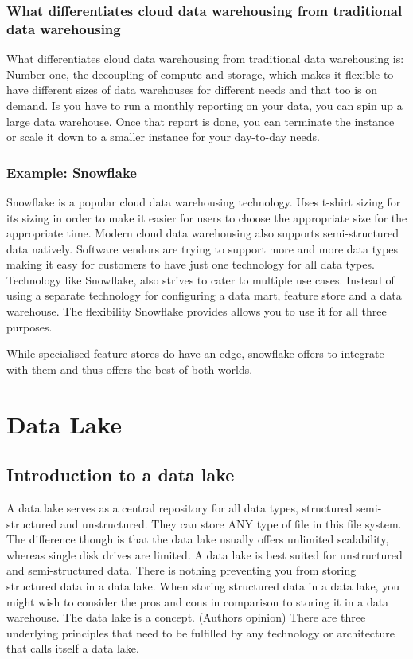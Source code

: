 \documentclass[a4paper, 11pt]{book}
\begin{document}
    \subsubsection{What differentiates cloud data warehousing from traditional data warehousing}
    What differentiates cloud data warehousing from traditional data warehousing is:
    Number one, the decoupling of compute and storage, which makes it flexible to have different sizes of data warehouses for different needs and that too is on demand.
    Is you have to run a monthly reporting on your data, you can spin up a large data warehouse.
    Once that report is done, you can terminate the instance or scale it down to a smaller instance for your day-to-day needs.

    \subsubsection{Example: Snowflake}
    Snowflake is a popular cloud data warehousing technology.
    Uses t-shirt sizing for its sizing in order to make it easier for users to choose the appropriate size for the appropriate time.
    Modern cloud data warehousing also supports semi-structured data natively.
    Software vendors are trying to support more and more data types making it easy for customers to have just one technology for all data types.
    Technology like Snowflake, also strives to cater to multiple use cases.
    Instead of using a separate technology for configuring a data mart, feature store and a data warehouse.
    The flexibility Snowflake provides allows you to use it for all three purposes.

    While specialised feature stores do have an edge, snowflake offers to integrate with them and thus offers the best of both worlds.

    \section{Data Lake}


    \subsection{Introduction to a data lake}
    A data lake serves as a central repository for all data types, structured semi-structured and unstructured.
    They can store ANY type of file in this file system.
    The difference though is that the data lake usually offers unlimited scalability, whereas single disk drives are limited.
    A data lake is best suited for unstructured and semi-structured data.
    There is nothing preventing you from storing structured data in a data lake.
    When storing structured data in a data lake, you might wish to consider the pros and cons in comparison to storing it in a data warehouse.
    The data lake is a concept.
    (Authors opinion) There are three underlying principles that need to be fulfilled by any technology or architecture that calls itself a data lake.
\end{document}
